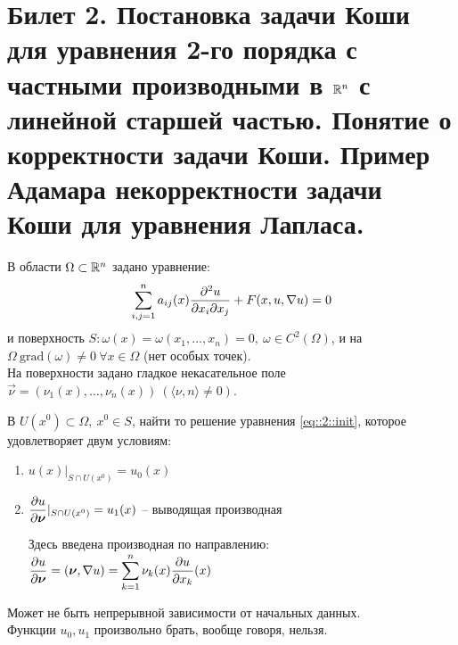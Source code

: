 \section{Билет 2. Постановка задачи Коши для уравнения 2-го порядка с частными производными в $\mathbb{R}^n$ с линейной старшей частью. Понятие о корректности задачи Коши. Пример Адамара некорректности задачи Коши для уравнения Лапласа.}
В области $\Omega \subset \mathbb{R}^n$ задано уравнение:
\begin{equation}
\label{eq::2::init}
\sum\limits_{i,j=1}^{n} a_{ij}(x)\frac{\partial^2u}{\partial x_i\partial x_j} + F(x, u, \nabla u) = 0
\end{equation}
и поверхность $S : \omega(x) = \omega(x_1, \dots, x_n) = 0,\ \omega \in C^2(\Omega)$, и на $\Omega\ \mathrm{grad}(\omega) \not= 0\ \forall x\in \Omega$ (нет особых точек).\\
На поверхности задано гладкое некасательное поле $\vec{\nu} = (\nu_1(x), \dots, \nu_n(x))\ (\langle \nu, n \rangle \not= 0)$.
\begin{definition}
В $U(x^0)\subset\Omega,\ x^0 \in S$, найти то решение уравнения \eqref{eq::2::init}, которое удовлетворяет двум условиям:
\begin{enumerate}
\item $u(x)|_{S\cap U(x^0)}=u_0(x)$
\item $\dfrac{\partial u}{\partial \boldsymbol{\nu}}|_{S\cap U(x^0)} = u_1(x)$ -- выводящая производная

Здесь введена производная по направлению: $\dfrac{\partial u}{\partial \boldsymbol{\nu}} = \left(\boldsymbol{\nu}, \nabla u\right) = \displaystyle\sum\limits_{k=1}^{n} \nu_k(x)\dfrac{\partial u}{\partial x_k}(x) $
\end{enumerate}
\end{definition}
Может не быть непрерывной зависимости от начальных данных.\\
Функции $u_0, u_1$ произвольно брать, вообще говоря, нельзя.


